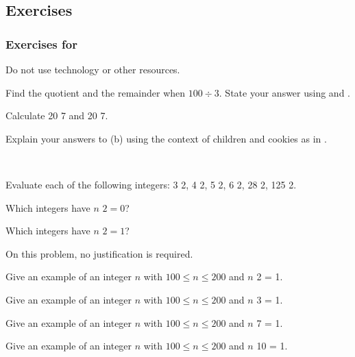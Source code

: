 
\subsection{Exercises}


\subsubsection*{Exercises for  \subdivalg}

\begin{exer}[\exerP] %
\label{exer_find_quotient_remainder}
Do not use technology or other resources.
    \begin{exerpart}
        \item Find the quotient and the remainder when $100 \div 3$.  State your answer using  and .
        \item Calculate 20  7 and 20  7.
        \item Explain your answers to (b) using the context of children and cookies as in .  
    \end{exerpart}
\end{exer}

\begin{exer}[\exerP] %
\label{exer_mod2_even_odd}
~
    \begin{exerpart}
        \item Evaluate each of the following integers: 3  2, 4  2, 5  2, 6  2, 28  2, 125  2.
        \item Which integers have $n$  $2 = 0$? 
        \item Which integers have $n$  $2 = 1$? 
    \end{exerpart}
\end{exer}

\begin{exer}[\exerU] %
\label{exer_examples_mod}
    On this problem, no justification is required.
    \begin{exerpart}
        \item Give an example of an integer $n$ with $100 \le n \le 200$ and $n$  2 = 1.
        \item Give an example of an integer $n$ with $100 \le n \le 200$ and $n$  3 = 1.
        \item Give an example of an integer $n$ with $100 \le n \le 200$ and $n$  7 = 1.
        \item Give an example of an integer $n$ with $100 \le n \le 200$ and $n$  10 = 1.
    \end{exerpart}
\end{exer}

